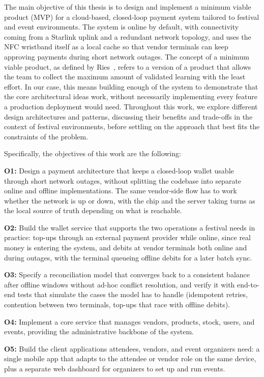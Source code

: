 The main objective of this thesis is to design and implement a minimum viable product (MVP) for a cloud-based, closed-loop payment system tailored to festival and event environments. The system is online by default, with connectivity coming from a Starlink uplink and a redundant network topology, and uses the NFC wristband itself as a local cache so that vendor terminals can keep approving payments during short network outages. The concept of a minimum viable product, as defined by Ries~\cite{Ries2011}, refers to a version of a product that allows the team to collect the maximum amount of validated learning with the least effort. In our case, this means building enough of the system to demonstrate that the core architectural ideas work, without necessarily implementing every feature a production deployment would need. Throughout this work, we explore different design architectures and patterns, discussing their benefits and trade-offs in the context of festival environments, before settling on the approach that best fits the constraints of the problem.

Specifically, the objectives of this work are the following:

\textbf{O1:} Design a payment architecture that keeps a closed-loop wallet usable through short network outages, without splitting the codebase into separate online and offline implementations. The same vendor-side flow has to work whether the network is up or down, with the chip and the server taking turns as the local source of truth depending on what is reachable.

\textbf{O2:} Build the wallet service that supports the two operations a festival needs in practice: top-ups through an external payment provider while online, since real money is entering the system, and debits at vendor terminals both online and during outages, with the terminal queueing offline debits for a later batch sync.

\textbf{O3:} Specify a reconciliation model that converges back to a consistent balance after offline windows without ad-hoc conflict resolution, and verify it with end-to-end tests that simulate the cases the model has to handle (idempotent retries, contention between two terminals, top-ups that race with offline debits).

\textbf{O4:} Implement a core service that manages vendors, products, stock, users, and events, providing the administrative backbone of the system.

\textbf{O5:} Build the client applications attendees, vendors, and event organizers need: a single mobile app that adapts to the attendee or vendor role on the same device, plus a separate web dashboard for organizers to set up and run events.

